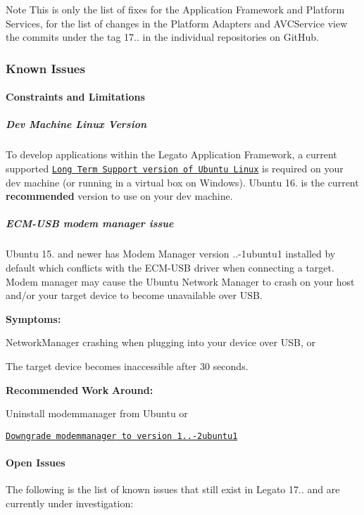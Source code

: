 \begin{DoxyNote}{Note}
This is only the list of fixes for the Application Framework and Platform Services, for the list of changes in the Platform Adapters and A\+V\+C\+Service view the commits under the tag 17.. in the individual repositories on Git\+Hub.
\end{DoxyNote}
\hypertarget{releaseNotes17090_rn1709_KnownIssues}{}\subsubsection{Known Issues}\label{releaseNotes17090_rn1709_KnownIssues}
\hypertarget{releaseNotes17090_rn1709_Constraints}{}\paragraph{Constraints and Limitations}\label{releaseNotes17090_rn1709_Constraints}
\hypertarget{releaseNotes17090_rn1709_ContraintsLinuxSupport}{}\subparagraph{Dev Machine Linux Version}\label{releaseNotes17090_rn1709_ContraintsLinuxSupport}
To develop applications within the Legato Application Framework, a current supported \href{https://www.ubuntu.com/info/release-end-of-life}{\tt Long Term Support version of Ubuntu Linux} is required on your dev machine (or running in a virtual box on Windows). Ubuntu 16. is the current {\bfseries recommended} version to use on your dev machine.\hypertarget{releaseNotes17090_rn1709_ConstECMUSB}{}\subparagraph{E\+C\+M-\/\+U\+S\+B modem manager issue}\label{releaseNotes17090_rn1709_ConstECMUSB}
Ubuntu 15. and newer has Modem Manager version {..-\/1ubuntu1} installed by default which conflicts with the E\+C\+M-\/\+U\+SB driver when connecting a target. Modem manager may cause the Ubuntu Network Manager to crash on your host and/or your target device to become unavailable over U\+SB.

{\bfseries Symptoms\+:} 
\begin{DoxyItemize}
\item Network\+Manager crashing when plugging into your device over U\+SB, or
\item The target device becomes inaccessible after 30 seconds.
\end{DoxyItemize}

{\bfseries Recommended} {\bfseries Work} {\bfseries Around\+:} 
\begin{DoxyItemize}
\item Uninstall {\ttfamily modemmanager} from Ubuntu or
\item \href{http://packages.ubuntu.com/trusty/modemmanager}{\tt Downgrade {\ttfamily modemmanager} to version 1..-\/2ubuntu1}
\end{DoxyItemize}\hypertarget{releaseNotes17090_rn1709_OpenIssues}{}\paragraph{Open Issues}\label{releaseNotes17090_rn1709_OpenIssues}
The following is the list of known issues that still exist in Legato 17.. and are currently under investigation\+:


